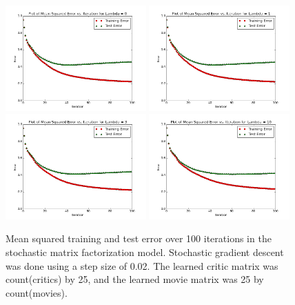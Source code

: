 \documentclass[12pt]{article}
\begin{document}
	\begin{figure}[H]
	\centering
	\includegraphics[width=0.48\textwidth]{plots/test-i100d25l0.png}
	\includegraphics[width=0.48\textwidth]{plots/test-i100d25l1.png}
	\includegraphics[width=0.48\textwidth]{plots/test-i100d25l3.png}
	\includegraphics[width=0.48\textwidth]{plots/test-i100d25l10.png}
	\caption{Mean squared training and test error over 100 iterations in the stochastic matrix factorization model. Stochastic gradient descent was done using a step size of 0.02. The learned critic matrix was count(critics) by 25, and the learned movie matrix was 25 by count(movies).}
	\label{fig:25}
	\end{figure}
\end{document}
